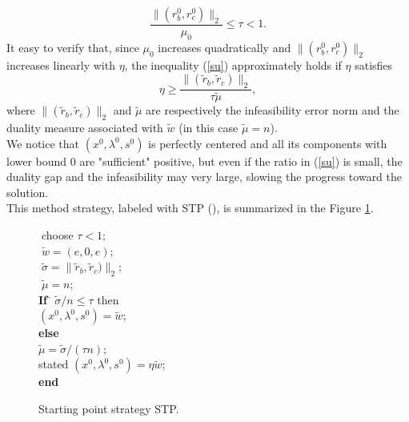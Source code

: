 \documentclass[a4paper,10 pt,titlepage,twoside]{book}
\theoremstyle{plain}
\theoremstyle{definition}
\theoremstyle{remark}
\begin{document}
\begin{equation}\label{su}
\frac{\lVert(r^{0}_{b},r^{0}_{c})\rVert_{2}}{\mu_{0}}\leq \tau<1. 
\end{equation}
It easy to verify that, since $\mu_{0}$ increases quadratically and $\lVert(r^{0}_{b},r^{0}_{c})\rVert_{2}$ increases linearly with $\eta$, the inequality (\ref{su}) approximately holds if $\eta$ satisfies
\begin{equation*}
\eta\geq \frac{\lVert(\tilde{r}_{b},\tilde{r}_{c})\rVert_{2}}{\tau\tilde{\mu}},
\end{equation*}
where $\lVert(\tilde{r}_{b},\tilde{r}_{c})\rVert_{2}$ and $\tilde{\mu}$ are respectively the infeasibility error norm and the duality measure associated with $\tilde{w}$ (in this case $\tilde{\mu} = n$). \\
We notice that $(x^{0},\lambda^{0},s^{0})$ is perfectly centered and all its components with lower bound 0 are "sufficient" positive, but even if the ratio in (\ref{su}) is small, the duality gap and the infeasibility may very large, slowing the progress toward the solution.\\
This method strategy, labeled with STP (\cite{SPS}), is summarized in the Figure \ref{fig:STP2}.\\
\begin{figure}\caption{\label{fig:STP2}Starting point strategy STP.}
	\centering
	{\noindent\begin{boxedminipage}{1\linewidth}
			\begin{tabbing}
			$\;$choose $\tau < 1$;  \\
			$\;\tilde{w}=(e,0,e)$;\\
			$\;\tilde{\sigma}= \lVert\tilde{r}_{b},\tilde{r}_{c})\rVert_{2}$;\\
			$\;\tilde{\mu}= n$;\\
			\textbf{ If} \= $\tilde{\sigma}/n\leq \tau$ then\\
			\> $(x^{0}, \lambda^{0}, s^{0}) = \tilde{w}$;$\;\;\;\;\;\;$\\
			\textbf{ else}\>\\
			\> $\tilde{\mu}=\tilde{\sigma}/(\tau n)$; \\
stated			\> $(x^{0}, \lambda^{0}, s^{0}) = \eta \tilde{w}$;\tab \\
			\textbf{ end}
			\end{tabbing}
\end{boxedminipage}
} \quad
\end{figure}
\end{document}
